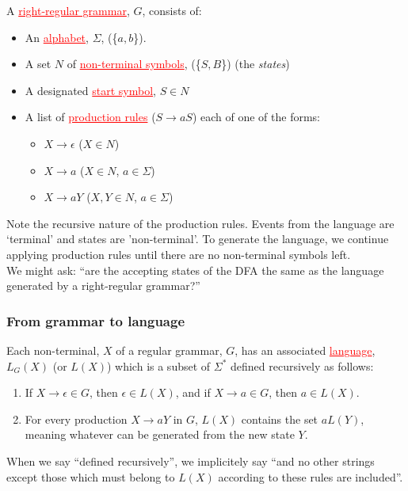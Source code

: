 \documentclass[11pt]{article}
\newcommand{\defn}[0]{\tcbhighmath[boxrule=0.5mm, colframe=cyan!20, colback=cyan!20, arc=10mm, size=fbox]{\textbf{DEF:}}}
\newcommand{\ru}[1]{\textcolor{red}{\underline{#1}}}
\begin{document}
\defn A \ru{right-regular grammar}, $G$, consists of:
\begin{itemize}[itemsep=-2pt]\setlength{\baselineskip}{10pt}
  \item An \ru{alphabet}, $\Sigma$, (\{$a, b$\}).
  \item A set $N$ of \ru{non-terminal symbols}, (\{$S, B$\}) (the \textit{states})
  \item A designated \ru{start symbol}, $S \in N$
  \item A list of \ru{production rules} ($S \to aS$) each of one of the forms:
    \begin{itemize}[itemsep=-2pt]\setlength{\baselineskip}{10pt}
      \item $X \to \epsilon$ ($X \in N$)
      \item $X \to a$ ($X \in N$, $a \in \Sigma$)
      \item $X \to aY$ ($X, Y \in N$, $a \in \Sigma$) 
    \end{itemize}
\end{itemize}

Note the recursive nature of the production rules. Events from the language are `terminal' and states are 'non-terminal'. To generate the language, we continue applying production rules until there are no non-terminal symbols left.\\
We might ask: ``are the accepting states of the DFA the same as the language generated by a right-regular grammar?''

\subsubsection{From grammar to language}

Each non-terminal, $X$ of a regular grammar, $G$, has an associated \ru{language}, $L_G(X)$ (or $L(X)$) which is a subset of $\Sigma ^*$ defined recursively as follows:
  \begin{enumerate}
    \item If $X \to \epsilon \in G$, then $\epsilon \in L(X)$, and if $X \to a \in G$, then $a \in L(X)$.
    \item For every production $X \to aY$ in $G$, $L(X)$ contains the set $aL(Y)$, meaning whatever can be generated from the new state $Y$.
  \end{enumerate}


When we say ``defined recursively'', we implicitely say ``and no other strings except those which must belong to $L(X)$ according to these rules are included''.\\
\end{document}
